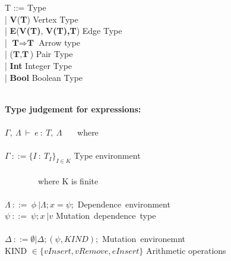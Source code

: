\begin{frame}
  \begin{tiny}
  \begin{roman-grammar}
  
  
  T ::= \>\>\>\>\> Type \\
    \ttab | \textbf{V}(\textbf{T}) \>\>\>\>\> Vertex Type \\
    \ttab | \textbf{E}(\textbf{V(T)}, \textbf{V(T),}\textbf{T}) \>\>\>\>\> Edge Type\\
    \ttab | $\textbf{T} \Rightarrow \textbf{T}$ \>\>\>\>\> Arrow type \\
    \ttab | ($\textbf{T}, \textbf{T}$) \>\>\>\>\> Pair Type \\
    \ttab | \textbf{Int} \>\>\>\>\> Integer Type \\
    \ttab | \textbf{Bool} \>\>\>\>\> Boolean Type\\ 
\ \\
\newline
\newline

  \textbf{Type judgement for expressions:}
  \\ \ \\
  $\Gamma, \ \Lambda \ \vdash \ e \ : \ T, \ \Lambda$ \ \ \  where \\ \ \\
  $\Gamma \ ::= {\{ I \ : \ T_I \}}_{I \in K}$ \>\>\>\> Type environment\\ \ \\
  \ \ \ \ \ \ \ \ where K is finite \\
  \ \\ $\Lambda \ ::= \ \phi \ | \Lambda; x=\psi;$  \>\>\>\> Dependence\ environment
  \ \\ $\psi \ ::= \ \psi ;x\ | v$ \>\>\>\> Mutation\ dependence\ type\\
  \ \\ $\Delta \ ::= \emptyset | \Delta; (\psi, KIND);$ \>\>\>\> Mutation\ environemnt\\
  KIND $\in \{vInsert, vRemove, eInsert\}$ \>\>\>\>  Arithmetic operations 

\end{roman-grammar}
\end{tiny}  
\end{frame}
